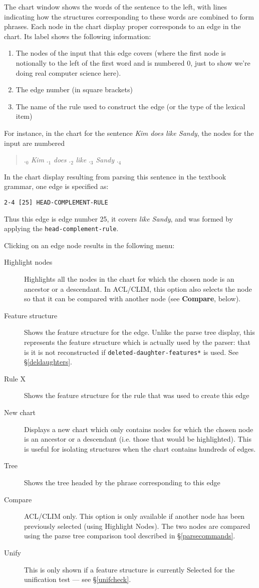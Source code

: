 \documentclass[12pt]{report}
\newcommand{\lkbentryname}[1]{{\tt #1}}
\newcommand{\lkbparam}[1]{{\tt #1}}
\newcommand{\lkbmenucommand}{{\bf}}
\begin{document}
The chart window shows the words of the sentence to the left,
with lines indicating how the structures corresponding to these words
are combined to form phrases.  Each node in the chart display proper
corresponds to an edge in the chart.
Its label shows the following information:
\begin{enumerate}
\item The nodes of the input that this edge covers (where the first node
is notionally to the left of the first word and
is numbered 0, just to show we're doing real computer science here).
\item The edge number (in square brackets)
\item The name of the rule used to construct the edge
(or the type of the lexical item)
\end{enumerate}
For instance, in the chart for the sentence {\it Kim does like Sandy},
the nodes for the input are numbered
\begin{quote}
.$_{0}$ {\it Kim} .$_{1}$ {\it does} .$_{2}$ {\it like} 
.$_{3}$ {\it Sandy} .$_{4}$  
\end{quote}
In the chart display resulting from parsing this sentence 
in the textbook grammar, one edge is specified as:
\begin{verbatim}
2-4 [25] HEAD-COMPLEMENT-RULE
\end{verbatim}
Thus this edge is edge number 25, it covers {\it like Sandy}, 
and was formed by applying the \lkbentryname{head-complement-rule}.

Clicking on an edge node results in the following menu:
\begin{description}
\item[Highlight nodes] Highlights all the nodes
in the chart for which the chosen node is an ancestor or a descendant.
In ACL/CLIM, 
this option also selects the node so that it can be compared with another
node (see {\bf Compare}, below).
\item[Feature structure] Shows the feature structure for the
edge.  Unlike the parse tree display, this represents the feature structure
which is actually used by the parser: that is it is not reconstructed
if \lkbparam{*deleted-daughter-features*} is used.  See \S\ref{deldaughters}.
\item[Rule X]  Shows the feature structure for the rule that was used
to create this edge
\item[New chart] Displays a new chart which only contains nodes
for which the chosen node is an ancestor or a descendant (i.e. those that
would be highlighted).  This is useful for isolating structures
when the chart contains
hundreds of edges.
\item[Tree] Shows the tree headed by the phrase corresponding to
this edge
\item[Compare] ACL/CLIM only.  This option is only
available if another node has been previously 
selected (using {\lkbmenucommand Highlight 
Nodes}).  The two nodes are compared using the parse tree comparison
tool described in \S\ref{parsecommands}.
\item[Unify] This is only shown if a feature structure
is currently {\lkbmenucommand Select}ed for the unification test --- see 
\S\ref{unifcheck}.
\end{description}
\end{document}
